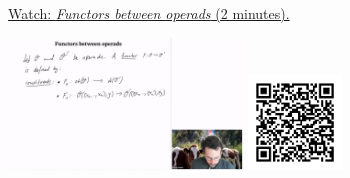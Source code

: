 
\begin{minipage}{10cm}
    \href{https://act4e-spring21.netlify.app/videos/spring2021-operads-b:functors-operads.html}{Watch: \emph{Functors between operads} (2 minutes).}
        
    \href{https://act4e-spring21.netlify.app/videos/spring2021-operads-b:functors-operads.html}{\includegraphics[height=3.5cm]{spring2021-operads-b:functors-operads/thumbnails.jpg}}
    \href{https://act4e-spring21.netlify.app/videos/spring2021-operads-b:functors-operads.html}{\includegraphics[height=2.5cm]{spring2021-operads-b:functors-operads/qrcode.png}}
\end{minipage}
